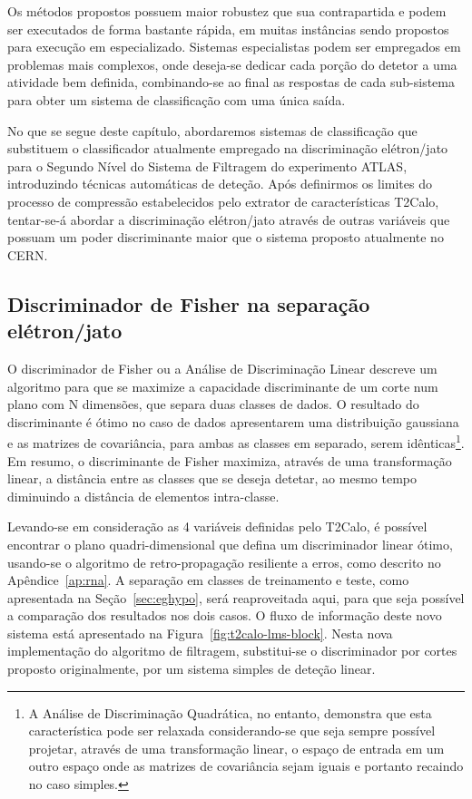 Os métodos propostos possuem maior robustez que sua contrapartida e podem ser
executados de forma bastante rápida, em muitas instâncias sendo propostos para
execução em  especializado. Sistemas especialistas podem ser
empregados em problemas mais complexos, onde deseja-se dedicar cada porção do
detetor a uma atividade bem definida, combinando-se ao final as respostas de
cada sub-sistema para obter um sistema de classificação com uma única saída.

No que se segue deste capítulo, abordaremos sistemas de classificação que
substituem o classificador atualmente empregado na discriminação elétron/jato
para o Segundo Nível do Sistema de Filtragem do experimento ATLAS,
introduzindo técnicas automáticas de deteção. Após definirmos os limites
do processo de compressão estabelecidos pelo extrator de características
T2Calo, tentar-se-á abordar a discriminação elétron/jato através de outras
variáveis que possuam um poder discriminante maior que o sistema proposto
atualmente no CERN.

\subsection{Discriminador de Fisher na separação e\-lé\-tron/jato}
\label{sec:linear}

O discriminador de Fisher \cite{fisher} ou a Análise de Discriminação Linear
descreve um algoritmo para que se maximize a capacidade discriminante de um
corte num plano com N dimensões, que separa duas classes de dados. O resultado
do discriminante é ótimo no caso de dados apresentarem uma distribuição
gaussiana e as matrizes de covariância, para ambas as classes em separado,
serem idênticas\footnote{A Análise de Discriminação Quadrática, no entanto,
demonstra que esta característica pode ser relaxada considerando-se que seja
sempre possível projetar, através de uma transformação linear, o espaço de
entrada em um outro espaço onde as matrizes de covariância sejam iguais e
portanto recaindo no caso simples.}. Em resumo, o discriminante de Fisher
maximiza, através de uma transformação linear, a distância entre as classes
que se deseja detetar, ao mesmo tempo diminuindo a distância de elementos
intra-classe.

Levando-se em consideração as 4 variáveis definidas pelo T2Calo, é possível
encontrar o plano quadri-dimensional que defina um discriminador linear ótimo,
usando-se o algoritmo de retro-propagação resiliente a erros, como descrito
no Apêndice~\ref{ap:rna}. A separação em classes de treinamento e teste, como
apresentada na Seção~\ref{sec:eghypo}, será reaproveitada aqui, para que seja
possível a comparação dos resultados nos dois casos. O fluxo de informação
deste novo sistema está apresentado na
Figura~\ref{fig:t2calo-lms-block}. Nesta nova implementação do algoritmo de
filtragem, substitui-se o discriminador por cortes proposto originalmente, por
um sistema simples de deteção linear.

